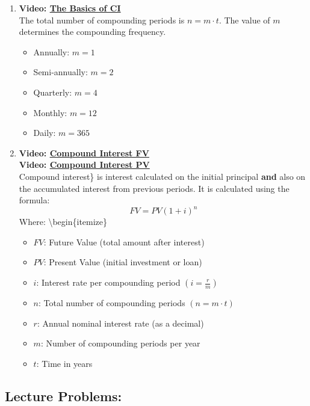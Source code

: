 \documentclass[
]{book}
\providecommand{\tightlist}{%
  \setlength{\itemsep}{0pt}\setlength{\parskip}{0pt}}
\begin{document}
\begin{enumerate}
\def\labelenumi{\arabic{enumi}.}
\tightlist
\item
  \textbf{Video: \href{https://youtu.be/y99qpJXtx3Q}{The Basics of CI}}\\
  The total number of compounding periods is \(n = m \cdot t\). The value of \(m\) determines the compounding frequency.

  \begin{itemize}
  \tightlist
  \item
    Annually: \(m = 1\)
  \item
    Semi-annually: \(m = 2\)
  \item
    Quarterly: \(m = 4\)
  \item
    Monthly: \(m = 12\)
  \item
    Daily: \(m = 365\)
  \end{itemize}
\item
  \textbf{Video: \href{https://youtu.be/YyV8hybwRT0}{Compound Interest FV}}\\
  \textbf{Video: \href{https://youtu.be/xu3JoFjM82w}{Compound Interest PV}}\\
  Compound interest\} is interest calculated on the initial principal \textbf{and} also on the accumulated interest from previous periods. It is calculated using the formula: \[
  FV = PV(1 + i)^n
  \]
  Where:
  \textbackslash begin\{itemize\}

  \begin{itemize}
  \tightlist
  \item
    \(FV\): Future Value (total amount after interest)
  \item
    \(PV\): Present Value (initial investment or loan)
  \item
    \(i\): Interest rate per compounding period \(\left( i = \frac{r}{m} \right)\)
  \item
    \(n\): Total number of compounding periods \(\left( n = m \cdot t \right)\)
  \item
    \(r\): Annual nominal interest rate (as a decimal)
  \item
    \(m\): Number of compounding periods per year
  \item
    \(t\): Time in years
  \end{itemize}
\end{enumerate}

\subsection*{Lecture Problems:}\label{lecture-problems-9}
\end{document}

